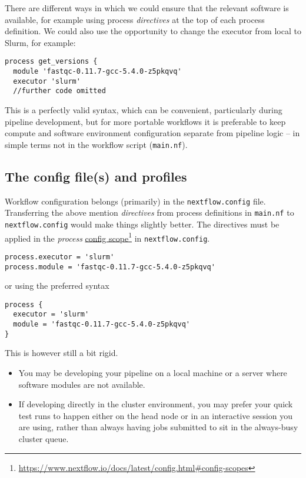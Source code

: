 There are different ways in which we could ensure that the relevant software is available, for example using process 
\emph{directives} at the top of each process definition. We could also use the opportunity to change the executor from local to Slurm, for example:
\begin{lstlisting}
process get_versions {
  module 'fastqc-0.11.7-gcc-5.4.0-z5pkqvq' 
  executor 'slurm' 
  //further code omitted 
\end{lstlisting}

This is a perfectly valid syntax, which can be convenient, particularly during pipeline development, 
but for more portable workflows it is preferable to keep compute and software environment configuration 
separate from pipeline logic -- in simple terms not in the workflow script (\texttt{main.nf}).


\subsection{The config file(s) and profiles}

Workflow configuration belongs (primarily) in the \texttt{nextflow.config} file. 
Transferring the above mention \emph{directives} from process definitions in \texttt{main.nf} 
to \texttt{nextflow.config} would make things slightly better. The directives must be applied 
in the \emph{process} \href{https://www.nextflow.io/docs/latest/config.html#config-scopes}{config scope}\footnote{\url{https://www.nextflow.io/docs/latest/config.html\#config-scopes}} in \texttt{nextflow.config}.


\begin{lstlisting}
process.executor = 'slurm' 
process.module = 'fastqc-0.11.7-gcc-5.4.0-z5pkqvq' 
\end{lstlisting}

or using the preferred syntax

\begin{lstlisting}
process {
  executor = 'slurm'
  module = 'fastqc-0.11.7-gcc-5.4.0-z5pkqvq'
}
\end{lstlisting}


This is however still a bit rigid. 
\begin{itemize}
\item You may be developing your pipeline on a local machine or a server where software modules are not available. 
\item If developing directly in the cluster environment, you may prefer your quick test runs to happen either on the head node or in an interactive session you are using, rather than always having jobs submitted to sit in the always-busy cluster queue.
\end{itemize}


